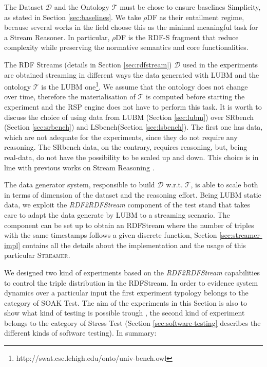 \noindent The Dataset  $\mathcal{D}$ and the Ontology $\mathcal{T}$ must be chose to ensure baselines Simplicity, as stated in Section \ref{sec:baselines}. We take $\rho$DF  \cite{DBLP:conf/esws/MunozPG07} as their entailment regime, because several works in the field \cite{DBLP:conf/semweb/UrbaniMJHB13} choose this as the minimal meaningful task for a Stream Reasoner. In particular, $\rho$DF is the RDF-S fragment that reduce complexity while preserving the normative semantics and core functionalities.

The RDF Streams (details in Section \ref{sec:rdfstream}) $\mathcal{D}$ used in the experiments are obtained streaming in different ways the data generated with LUBM  \cite{Guo2005} and the ontology $\mathcal{T}$ is the LUBM one\footnote{http://swat.cse.lehigh.edu/onto/univ-bench.owl}. We assume that the ontology does not change over time, therefore the materialisation of $\mathcal{T}$ is computed before starting the experiment and the RSP engine does not have to perform this task. It is worth to discuss the choice of using data from LUBM (Section \ref{sec:lubm}) over SRbench (Section \ref{sec:srbench}) and LSbench(Section \ref{sec:lsbench}). The first one has data, which are not adequate for the experiments, since they do not require any reasoning. The SRbench data, on the contrary, requires reasoning, but, being real-data, do not have the possibility to be scaled up and down. This choice is in line with previous works on Stream Reasoning \cite{DBLP:conf/semweb/UrbaniMJHB13}. 

The data generator system, responsible to build $\mathcal{D}$ w.r.t. $\mathcal{T}$, is able to scale both in terms of dimension of the dataset and the reasoning effort. Being LUBM static data, we exploit the \textit{RDF2RDFStream} component of the test stand that takes care to adapt the data generate by LUBM to a streaming scenario. The component can be set up to obtain an RDFStream where the number of triples with the same timestamps follows a given discrete function, Section \ref{sec:streamer-impl} contains all the details about the implementation and the usage of this particular \textsc{Streamer}. %

We designed two kind of experiments based on the \textit{RDF2RDFStream} capabilities to control the triple distribution in the RDFStream. In order to evidence system dynamics over a particular input the first experiment typology belongs to the category of SOAK Test. The aim of the experiments in this Section is also to show what kind of testing is possible trough \namens, the second kind of experiment belongs to the category of Stress Test (Section \ref{sec:software-testing} describes the different kinds of software testing). In summary:

